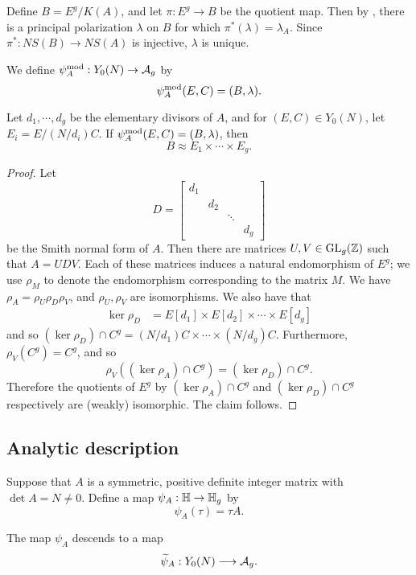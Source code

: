 \documentclass{amsart}
\begin{document}
Define $B = E^g/K(A)$, and let $\pi: E^g \to B$ be the quotient map. Then by \cite[Prop. 16.8]{milne-av}, there is a principal polarization $\lambda$ on $B$ for which $\pi^*(\lambda) = \lambda_A$. Since $\pi^*: NS(B) \to NS(A)$ is injective, $\lambda$ is unique.

We define $\psi_{A}^\mathrm{mod}: Y_0(N) \to \mathcal{A}_g$ by
\[
  \psi_{A}^\mathrm{mod}(E,C) = (B,\lambda).
\]


\begin{proposition}\label{prop:psimod-weakly-isomorphic-to-product}
  Let $d_1, \cdots, d_g$ be the elementary divisors of $A$, and for $(E,C) \in Y_0(N)$, let $E_i = E/(N/d_i)C$. If $\psi_{A}^\mathrm{mod}(E,C) = (B,\lambda)$, then
  \[
    B \approx E_1 \times \cdots \times E_g.
  \]
\end{proposition}

\begin{proof}
  Let
   \[
     D =
    \begin{bmatrix}
      {d_1} & & & \\
      & {d_2} & & \\
      & & \ddots & \\
      & & & {d_{g}}
    \end{bmatrix}
  \]
  be the Smith normal form of $A$. Then there are matrices $U,V \in \operatorname{GL}_g(\mathbb{Z})$ such that $A = UDV$. Each of these matrices induces a natural endomorphism of $E^g$; we use $\rho_M$ to denote the endomorphism corresponding to the matrix $M$. We have $\rho_A = \rho_U \rho_D \rho_V$, and $\rho_U, \rho_V$ are isomorphisms. We also have that
  \begin{align*}
    \ker \rho_D &= E[d_1] \times E[d_2] \times \cdots \times E[d_g]
  \end{align*}
  and so $(\ker \rho_D) \cap C^g = (N/d_1)C \times \cdots \times (N/d_g)C$. Furthermore, $\rho_V(C^g) = C^g$, and so
  \[
    \rho_V((\ker \rho_A) \cap C^g) = (\ker \rho_D) \cap C^g.
  \]
  Therefore the quotients of $E^g$ by $(\ker \rho_A) \cap C^g$ and $(\ker \rho_D) \cap C^g$ respectively are (weakly) isomorphic. The claim follows.
\end{proof}

\subsection{Analytic description}
\label{sec:ana-desc}

Suppose that $A$ is a symmetric, positive definite integer matrix with $\det A = N \neq 0$. Define a map $\psi_A: \mathbb{H} \to \mathbb{H}_g$ by
\[
  \psi_A(\tau) = \tau A.
\]
\begin{proposition}
The map $\psi_A$ descends to a map
\begin{equation}\label{def:psi-A-n}
  \widetilde{\psi}_{A}: Y_0(N) \longrightarrow \mathcal{A}_g.
\end{equation}
\end{proposition}
\end{document}
